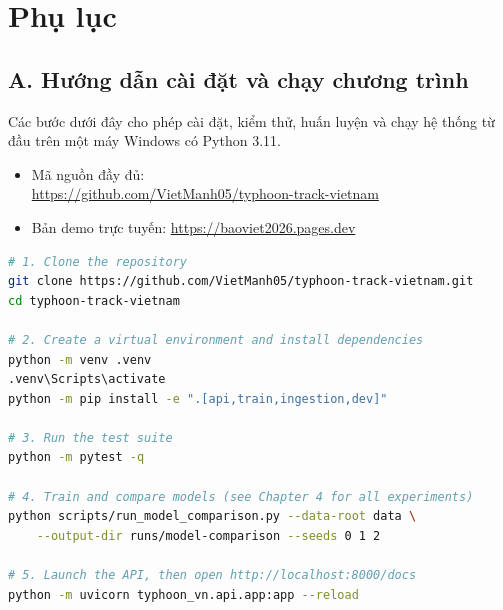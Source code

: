 \chapter{Phụ lục}

\section*{A. Hướng dẫn cài đặt và chạy chương trình}
{}

Các bước dưới đây cho phép cài đặt, kiểm thử, huấn luyện và chạy hệ thống
từ đầu trên một máy Windows có Python 3.11.

\begin{itemize}[leftmargin=1.6em, itemsep=2pt]
  \item Mã nguồn đầy đủ:\\ \url{https://github.com/VietManh05/typhoon-track-vietnam}
  \item Bản demo trực tuyến: \url{https://baoviet2026.pages.dev}
\end{itemize}

\begin{lstlisting}[language=bash, caption={Các bước cài đặt, huấn luyện và khởi chạy hệ thống.}]
# 1. Clone the repository
git clone https://github.com/VietManh05/typhoon-track-vietnam.git
cd typhoon-track-vietnam

# 2. Create a virtual environment and install dependencies
python -m venv .venv
.venv\Scripts\activate
python -m pip install -e ".[api,train,ingestion,dev]"

# 3. Run the test suite
python -m pytest -q

# 4. Train and compare models (see Chapter 4 for all experiments)
python scripts/run_model_comparison.py --data-root data \
    --output-dir runs/model-comparison --seeds 0 1 2

# 5. Launch the API, then open http://localhost:8000/docs
python -m uvicorn typhoon_vn.api.app:app --reload
\end{lstlisting}

